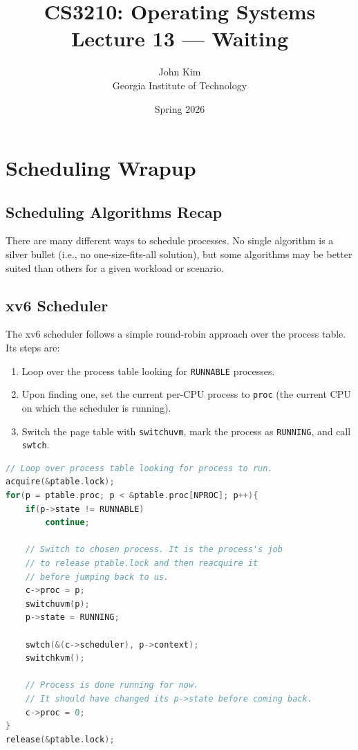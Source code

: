 \documentclass[11pt]{article}
\title{\textbf{CS3210: Operating Systems} \\ Lecture 13 --- Waiting}
\author{John Kim \\ Georgia Institute of Technology}
\date{Spring 2026}
\begin{document}
\maketitle
\tableofcontents
\newpage

\section{Scheduling Wrapup}

\subsection{Scheduling Algorithms Recap}

There are many different ways to schedule processes. No single algorithm is a silver bullet (i.e., no one-size-fits-all solution), but some algorithms may be better suited than others for a given workload or scenario.

\subsection{xv6 Scheduler}

The xv6 scheduler follows a simple round-robin approach over the process table. Its steps are:

\begin{enumerate}
    \item Loop over the process table looking for \texttt{RUNNABLE} processes.
    \item Upon finding one, set the current per-CPU process to \texttt{proc} (the current CPU on which the scheduler is running).
    \item Switch the page table with \texttt{switchuvm}, mark the process as \texttt{RUNNING}, and call \texttt{swtch}.
\end{enumerate}

\begin{lstlisting}[language=C, caption={xv6 scheduler loop (proc.c)}]
// Loop over process table looking for process to run.
acquire(&ptable.lock);
for(p = ptable.proc; p < &ptable.proc[NPROC]; p++){
    if(p->state != RUNNABLE)
        continue;

    // Switch to chosen process. It is the process's job
    // to release ptable.lock and then reacquire it
    // before jumping back to us.
    c->proc = p;
    switchuvm(p);
    p->state = RUNNING;

    swtch(&(c->scheduler), p->context);
    switchkvm();

    // Process is done running for now.
    // It should have changed its p->state before coming back.
    c->proc = 0;
}
release(&ptable.lock);
\end{lstlisting}
\end{document}
